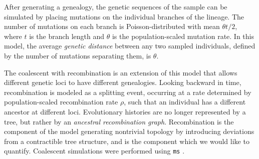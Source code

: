 After generating a genealogy, the genetic sequences of the sample can be simulated by placing mutations on the individual branches of the lineage.
The number of mutations on each branch is Poisson-distributed with mean $\theta t / 2$, where $t$ is the branch length and $\theta$ is the population-scaled mutation rate.
In this model, the average \emph{genetic distance} between any two sampled individuals, defined by the number of mutations separating them, is $\theta$.

The coalescent with recombination is an extension of this model that allows different genetic loci to have different genealogies.
Looking backward in time, recombination is modeled as a splitting event, occurring at a rate determined by population-scaled recombination rate $\rho$, such that an individual has a different ancestor at different loci.
Evolutionary histories are no longer represented by a tree, but rather by an \emph{ancestral recombination graph}.
Recombination is the component of the model generating nontrivial topology by introducing deviations from a contractible tree structure, and is the component which we would like to quantify.
Coalescent simulations were performed using \texttt{ms} \cite{Hudson:2002}.

